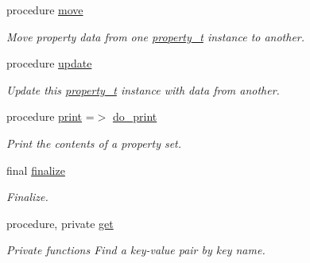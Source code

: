 \begin{DoxyCompactItemize}
procedure \mbox{\hyperlink{structpmc__property_1_1property__t_aa7409735b20d45715f4ac39dc76de955}{move}}
\begin{DoxyCompactList}\small\item\em Move property data from one \mbox{\hyperlink{structpmc__property_1_1property__t}{property\+\_\+t}} instance to another. \end{DoxyCompactList}\item 
procedure \mbox{\hyperlink{structpmc__property_1_1property__t_a12d75664ff2c58cb563122b0bbd09446}{update}}
\begin{DoxyCompactList}\small\item\em Update this \mbox{\hyperlink{structpmc__property_1_1property__t}{property\+\_\+t}} instance with data from another. \end{DoxyCompactList}\item 
procedure \mbox{\hyperlink{structpmc__property_1_1property__t_af5f4f2c17a99e7bbff86bb10bf7ce938}{print}} =$>$ \mbox{\hyperlink{namespacepmc__property_a3f735ac876b8ed0ecd03cc71febb3b66}{do\+\_\+print}}
\begin{DoxyCompactList}\small\item\em Print the contents of a property set. \end{DoxyCompactList}\item 
final \mbox{\hyperlink{structpmc__property_1_1property__t_af8f2d29ce11f87a57c6c79e983b88672}{finalize}}
\begin{DoxyCompactList}\small\item\em Finalize. \end{DoxyCompactList}\item 
procedure, private \mbox{\hyperlink{structpmc__property_1_1property__t_a96512268a19f371ebe92eaa25f71ca80}{get}}
\begin{DoxyCompactList}\small\item\em Private functions Find a key-\/value pair by key name. \end{DoxyCompactList}\end{DoxyCompactItemize}

